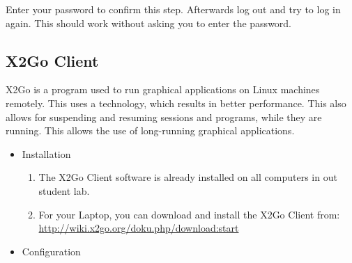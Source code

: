Enter your password to confirm this step. Afterwards log out and try to
log in again. This should work without asking you to enter the password.

\hypertarget{x2go-client}{%
\subsection{X2Go Client}\label{x2go-client}}

X2Go is a program used to run graphical applications on Linux machines
remotely. This uses a technology, which results in better performance.
This also allows for suspending and resuming sessions and programs,
while they are running. This allows the use of long-running graphical
applications.

\begin{itemize}
\item
  Installation
  \begin{enumerate}
  \def\labelenumi{\alph{enumi}.}
  \item
    The X2Go Client software is already installed on all computers in
    out student lab.
  \item
    For your Laptop, you can download and install the X2Go Client from:
    \url{http://wiki.x2go.org/doku.php/download:start}
  \end{enumerate}
\item
  Configuration


\end{itemize}
